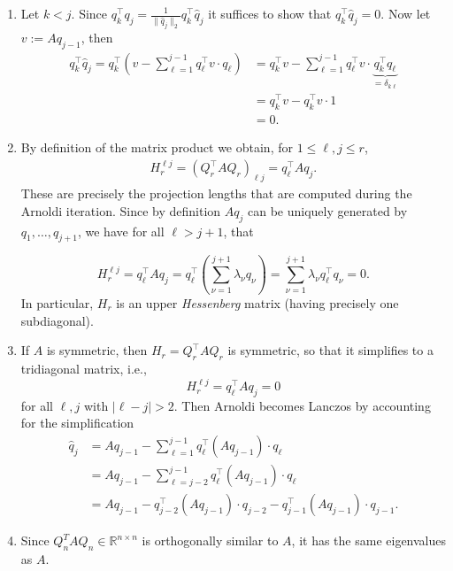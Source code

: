 {\color{solution}
\begin{enumerate}
	\item Let $k < j$. Since $q_k^\top q_j = \frac{1}{ \|\widehat{q}_j\|_2} q_k^\top \widehat{q}_j$ it suffices to show that $q_k^\top \widehat{q}_j=0$. Now let $v:=Aq_{j-1}$, then
	\begin{align*}
q_k^\top 	\widehat{q}_j  = q_k^\top \left(v - \sum_{\ell = 1}^{j-1} q_\ell^\top v  \cdot q_\ell\right)  
	&= q_k^\top v - \sum_{\ell = 1}^{j-1} q_\ell^\top v   \cdot \underbrace{q_k^\top q_\ell}_{= \delta_{k\ell}} \\
	&=q_k^\top v -  q_k^\top v\cdot 1\\
	&=0.  
	\end{align*}
	\item By definition of the matrix product we obtain, for $1\leq \ell,j \leq r$,
	\begin{align*}
	  H_r^{\ell j} = (Q_r^\top AQ_r)_{\ell j} = q_\ell ^\top Aq_j  .
	\end{align*}
	These are precisely the projection lengths that are computed during the Arnoldi iteration. Since by definition $Aq_j$ can be uniquely generated by $q_1,\ldots, q_{j+1}$, we have for all $\ell> j+1$, that
	
	$$H_r^{\ell j} = q_\ell ^\top Aq_j = q_\ell^\top \left(\sum_{\nu = 1}^{j+1}\lambda_\nu q_\nu\right) =\sum_{\nu = 1}^{j+1}\lambda_\nu q_\ell^\top q_\nu = 0 .$$ 
	In particular, $H_r$ is an upper \textit{Hessenberg} matrix (having precisely one subdiagonal).
	\item If $A$ is symmetric, then $H_r = Q_r^\top A Q_r$ is symmetric, so that it simplifies to a tridiagonal matrix, i.e., $$H_r^{\ell j} =q_\ell ^\top Aq_j = 0$$ for all $\ell,j$ with $|\ell-j|> 2$. Then Arnoldi becomes Lanczos by accounting for the simplification
	\begin{align*}
	 \widehat{q}_j 
	 &= Aq_{j-1} - \sum_{\ell = 1}^{j-1} q_\ell^\top(Aq_{j-1})  \cdot q_\ell\\
	 &= Aq_{j-1} - \sum_{\ell = j-2}^{j-1} q_\ell^\top(Aq_{j-1})  \cdot q_\ell\\
	 &= Aq_{j-1} - q_{j-2}^\top(Aq_{j-1})  \cdot q_{j-2} - q_{j-1}^\top(Aq_{j-1})\cdot q_{j-1}.
	\end{align*}
  \item Since $Q_n^TAQ_n \in \mathbb{R}^{n \times n}$ is orthogonally similar to $A$, it has the same eigenvalues as $A$.
\end{enumerate}



}